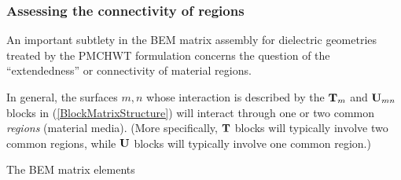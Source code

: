 \subsubsection*{Assessing the connectivity of regions}

An important subtlety in the BEM matrix assembly for dielectric
geometries treated by the PMCHWT formulation concerns the question
of the ``extendedness'' or connectivity of material regions.

In general, the surfaces $m,n$ whose interaction is described
by the $\mathbf{T}_m$ and $\mathbf{U}_{mn}$ blocks in (\ref{BlockMatrixStructure}) 
will interact through one or two common \textit{regions} (material media).
(More specifically, $\mathbf{T}$ blocks will typically involve two common
regions, while $\mathbf{U}$ blocks will typically involve one common region.)

The BEM matrix elements


